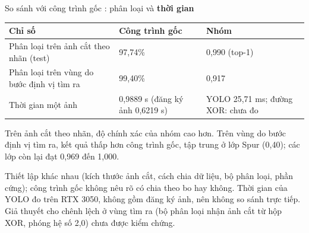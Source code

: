 \documentclass[aspectratio=169,11pt,t]{beamer}
\newcommand{\hl}[1]{{\bfseries\color{coral}#1}}
\newcommand{\hdr}[1]{{\bfseries\color{muted}#1}}
\begin{document}
\begin{frame}{So sánh với công trình gốc \cite{r1}: phân loại và \hl{thời gian}}
  \footnotesize
  \renewcommand{\arraystretch}{1.3}\setlength{\tabcolsep}{5pt}
  \begin{tabular}{@{}L{4.4cm}L{3.9cm}L{3.9cm}@{}}
    \toprule
    \hdr{Chỉ số} & \hdr{Công trình gốc \cite{r1}} & \hdr{Nhóm} \\
    \midrule
    Phân loại trên ảnh cắt theo nhãn (test) & 97,74\% & 0,990 (top-1) \\
    Phân loại trên vùng do bước định vị tìm ra & 99,40\% & 0,917 \\
    Thời gian một ảnh & 0,9889 s (đăng ký ảnh 0,6219 s) & YOLO 25,71 ms; đường XOR: chưa đo \\
    \bottomrule
  \end{tabular}
  \vspace{6pt}\par
  \begin{key}
    \footnotesize Trên ảnh cắt theo nhãn, độ chính xác của nhóm cao hơn. Trên vùng do bước định vị tìm ra, kết quả thấp hơn công trình gốc, tập trung ở lớp Spur (0,40); các lớp còn lại đạt 0,969 đến 1,000.
  \end{key}
  \vspace{3pt}
  \begin{trap}
    \scriptsize Thiết lập khác nhau (kích thước ảnh cắt, cách chia dữ liệu, bộ phân loại, phần cứng); công trình gốc không nêu rõ có chia theo bo hay không. Thời gian của YOLO đo trên RTX 3050, không gồm đăng ký ảnh, nên không so sánh trực tiếp. Giả thuyết cho chênh lệch ở vùng tìm ra (bộ phân loại nhận ảnh cắt từ hộp XOR, phóng hệ số 2,0) chưa được kiểm chứng.
  \end{trap}
\end{frame}

\end{document}
